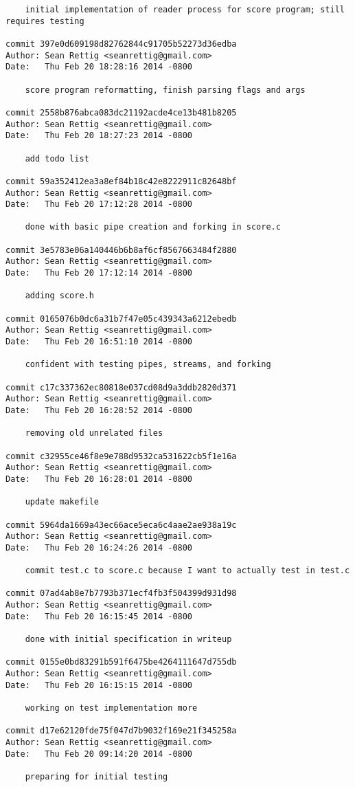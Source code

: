 \documentclass[letterpaper,10pt,fleqn]{article}
\numberwithin{equation}{section}
\begin{document}
\begin{verbatim}
    initial implementation of reader process for score program; still requires testing

commit 397e0d609198d82762844c91705b52273d36edba
Author: Sean Rettig <seanrettig@gmail.com>
Date:   Thu Feb 20 18:28:16 2014 -0800

    score program reformatting, finish parsing flags and args

commit 2558b876abca083dc21192acde4ce13b481b8205
Author: Sean Rettig <seanrettig@gmail.com>
Date:   Thu Feb 20 18:27:23 2014 -0800

    add todo list

commit 59a352412ea3a8ef84b18c42e8222911c82648bf
Author: Sean Rettig <seanrettig@gmail.com>
Date:   Thu Feb 20 17:12:28 2014 -0800

    done with basic pipe creation and forking in score.c

commit 3e5783e06a140446b6b8af6cf8567663484f2880
Author: Sean Rettig <seanrettig@gmail.com>
Date:   Thu Feb 20 17:12:14 2014 -0800

    adding score.h

commit 0165076b0dc6a31b7f47e05c439343a6212ebedb
Author: Sean Rettig <seanrettig@gmail.com>
Date:   Thu Feb 20 16:51:10 2014 -0800

    confident with testing pipes, streams, and forking

commit c17c337362ec80818e037cd08d9a3ddb2820d371
Author: Sean Rettig <seanrettig@gmail.com>
Date:   Thu Feb 20 16:28:52 2014 -0800

    removing old unrelated files

commit c32955ce46f8e9e788d9532ca531622cb5f1e16a
Author: Sean Rettig <seanrettig@gmail.com>
Date:   Thu Feb 20 16:28:01 2014 -0800

    update makefile

commit 5964da1669a43ec66ace5eca6c4aae2ae938a19c
Author: Sean Rettig <seanrettig@gmail.com>
Date:   Thu Feb 20 16:24:26 2014 -0800

    commit test.c to score.c because I want to actually test in test.c

commit 07ad4ab8e7b7793b371ecf4fb3f504399d931d98
Author: Sean Rettig <seanrettig@gmail.com>
Date:   Thu Feb 20 16:15:45 2014 -0800

    done with initial specification in writeup

commit 0155e0bd83291b591f6475be4264111647d755db
Author: Sean Rettig <seanrettig@gmail.com>
Date:   Thu Feb 20 16:15:15 2014 -0800

    working on test implementation more

commit d17e62120fde75f047d7b9032f169e21f345258a
Author: Sean Rettig <seanrettig@gmail.com>
Date:   Thu Feb 20 09:14:20 2014 -0800

    preparing for initial testing
\end{verbatim}
\end{document}

